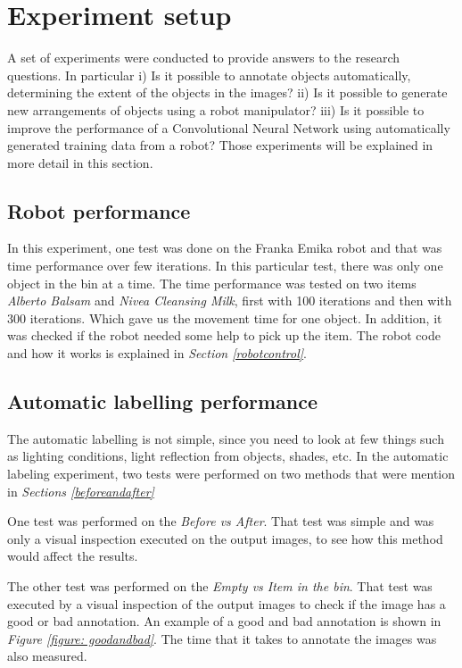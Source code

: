 \section{Experiment setup}
A set of experiments were conducted to provide answers to the research questions.  In particular i) Is it possible to annotate objects automatically, determining the extent of the objects in the images? ii) Is it possible to generate new arrangements of objects using a robot manipulator? iii) Is it possible to improve the performance of a Convolutional Neural Network using automatically generated training data from a robot? Those experiments will be explained in more detail in this section. 
\subsection{Robot performance}
In this experiment, one test was done on the Franka Emika robot and that was time performance over few iterations. In this particular test, there was only one object in the bin at a time. The time performance was tested on two items \textit{Alberto Balsam} and \textit{Nivea Cleansing Milk}, first with 100 iterations and then with 300 iterations. Which gave us the movement time for one object. In addition, it was checked if the robot needed some help to pick up the item. The robot code and how it works is explained in \textit{Section \ref{robotcontrol}}. 

\subsection{Automatic labelling performance}
The automatic labelling is not simple, since you need to look at few things such as lighting conditions, light reflection from objects, shades, etc. 
In the automatic labeling experiment, two tests were performed on two methods that were mention in \textit{Sections \ref{beforeandafter}}

One test was performed on the \textit{Before vs After}. That test was simple and was only a visual inspection executed on the output images, to see how this method would affect the results.

The other test was performed on the \textit{Empty vs Item in the bin}. That test was executed by a visual inspection of the output images to check if the image has a good or bad annotation. An example of a good and bad annotation is shown in \textit{Figure \ref{figure: goodandbad}}. The time that it takes to annotate the images was also measured.

